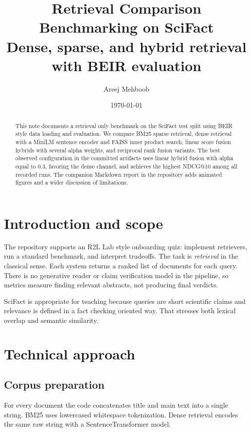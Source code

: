 \documentclass[11pt,a4paper]{article}
\title{Retrieval Comparison Benchmarking on SciFact\\
\large Dense, sparse, and hybrid retrieval with BEIR evaluation}
\author{Areej Mehboob}
\date{\today}
\begin{document}
\maketitle

\begin{abstract}
This note documents a retrieval only benchmark on the SciFact test split using BEIR style data loading and evaluation. We compare BM25 sparse retrieval, dense retrieval with a MiniLM sentence encoder and FAISS inner product search, linear score fusion hybrids with several alpha weights, and reciprocal rank fusion variants. The best observed configuration in the committed artifacts uses linear hybrid fusion with alpha equal to $0.3$, favoring the dense channel, and achieves the highest NDCG@10 among all recorded runs. The companion Markdown report in the repository adds animated figures and a wider discussion of limitations.
\end{abstract}

\section{Introduction and scope}

The repository supports an R2L Lab style onboarding quiz: implement retrievers, run a standard benchmark, and interpret tradeoffs. The task is \emph{retrieval} in the classical sense. Each system returns a ranked list of documents for each query. There is no generative reader or claim verification model in the pipeline, so metrics measure finding relevant abstracts, not producing final verdicts.

SciFact is appropriate for teaching because queries are short scientific claims and relevance is defined in a fact checking oriented way. That stresses both lexical overlap and semantic similarity.

\section{Technical approach}

\subsection{Corpus preparation}

For every document the code concatenates title and main text into a single string. BM25 uses lowercased whitespace tokenization. Dense retrieval encodes the same raw string with a SentenceTransformer model.
\end{document}
